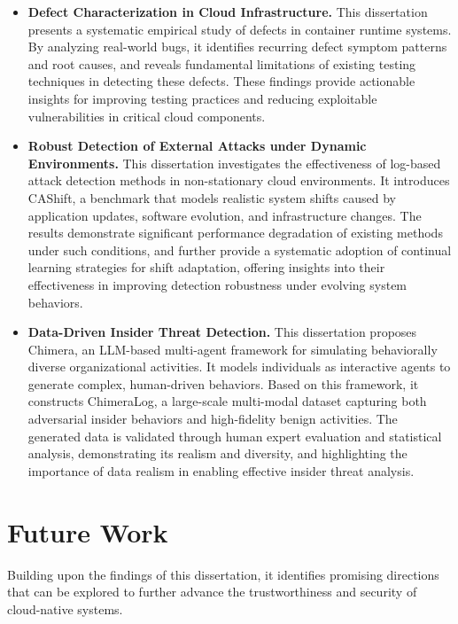 \begin{itemize}

\item \textbf{Defect Characterization in Cloud Infrastructure.} This dissertation presents a systematic empirical study of defects in container runtime systems. By analyzing real-world bugs, it identifies recurring defect symptom patterns and root causes, and reveals fundamental limitations of existing testing techniques in detecting these defects. These findings provide actionable insights for improving testing practices and reducing exploitable vulnerabilities in critical cloud components.

\item \textbf{Robust Detection of External Attacks under Dynamic Environments.} This dissertation investigates the effectiveness of log-based attack detection methods in non-stationary cloud environments. It introduces CAShift, a benchmark that models realistic system shifts caused by application updates, software evolution, and infrastructure changes. The results demonstrate significant performance degradation of existing methods under such conditions, and further provide a systematic adoption of continual learning strategies for shift adaptation, offering insights into their effectiveness in improving detection robustness under evolving system behaviors.

\item \textbf{Data-Driven Insider Threat Detection.} This dissertation proposes Chimera, an LLM-based multi-agent framework for simulating behaviorally diverse organizational activities. It models individuals as interactive agents to generate complex, human-driven behaviors. Based on this framework, it constructs ChimeraLog, a large-scale multi-modal dataset capturing both adversarial insider behaviors and high-fidelity benign activities. The generated data is validated through human expert evaluation and statistical analysis, demonstrating its realism and diversity, and highlighting the importance of data realism in enabling effective insider threat analysis.

\end{itemize}

\section{Future Work}

Building upon the findings of this dissertation, it identifies promising directions that can be explored to further advance the trustworthiness and security of cloud-native systems.